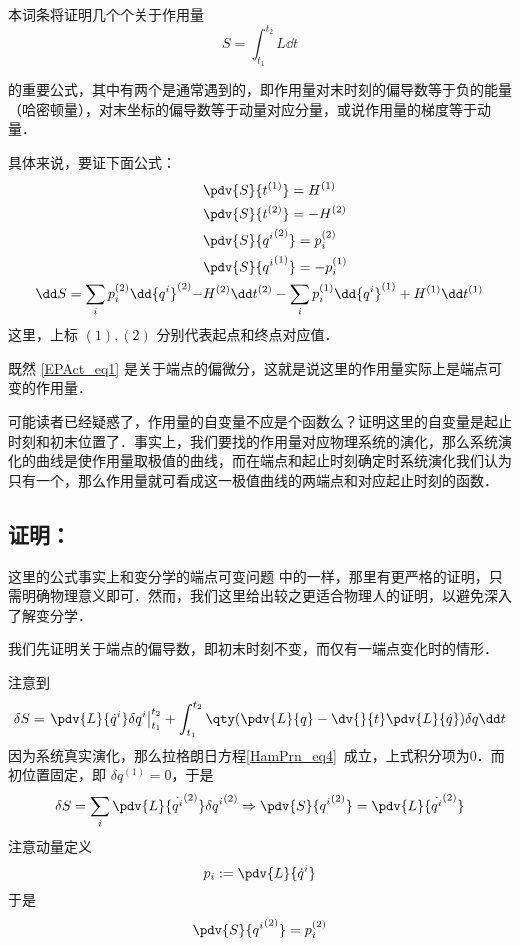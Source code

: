 本词条将证明几个个关于作用量
\begin{equation}
S=\int_{t_1}^{t_2}L\dd t
\end{equation}

的重要公式，其中有两个是通常遇到的，即作用量对末时刻的偏导数等于负的能量（哈密顿量），对末坐标的偏导数等于动量对应分量，或说作用量的梯度等于动量．

具体来说，要证下面公式：
\begin{equation}\label{EPAct_eq1}
\begin{aligned}
&\pdv{S}{t^{(1)}}=H^{(1)}\\
&\pdv{S}{t^{(2)}}=-H^{(2)}\\
&\pdv{S}{{q^i}^{(2)}}=p_i^{(2)}\\
&\pdv{S}{{q^i}^{(1)}}=-p_i^{(1)}\\
\dd S=\sum_i p_i^{(2)}\dd {q^i}^{(2)}-&H^{(2)}\dd t^{(2)}-\sum_i p_i^{(1)}\dd {q^i}^{(1)}+H^{(1)}\dd t^{(1)}
\end{aligned}
\end{equation}
这里，上标 $(1),(2)$ 分别代表起点和终点对应值．

既然 \autoref{EPAct_eq1} 是关于端点的偏微分，这就是说这里的作用量实际上是端点可变的作用量．

可能读者已经疑惑了，作用量的自变量不应是个函数么？证明这里的自变量是起止时刻和初末位置了．事实上，我们要找的作用量对应物理系统的演化，那么系统演化的曲线是使作用量取极值的曲线，而在端点和起止时刻确定时系统演化我们认为只有一个，那么作用量就可看成这一极值曲线的两端点和对应起止时刻的函数．
\subsection{证明：}
这里的公式事实上和变分学的端点可变问题 中的一样，那里有更严格的证明，只需明确物理意义即可．然而，我们这里给出较之更适合物理人的证明，以避免深入了解变分学．

我们先证明关于端点的偏导数，即初末时刻不变，而仅有一端点变化时的情形．

注意到
\begin{equation}
\delta S=\left.\pdv{L}{\dot q^i}\delta q^i\right|_{t_1}^{t_2}+\int_{t_1}^{t_2}\qty(\pdv{L}{q}-\dv{}{t}\pdv{L}{\dot q})\delta q\dd t
\end{equation}
因为系统真实演化，那么拉格朗日方程\autoref{HamPrn_eq4}~成立，上式积分项为0．而初位置固定，即 $\delta q^{(1)}=0$，于是
\begin{equation}
\delta S=\sum_i\pdv{L}{\dot {q^i}^{(2)}}\delta {q^i}^{(2)}\Rightarrow \pdv{S}{{q^i}^{(2)}}=\pdv{L}{\dot {q^i}^{(2)}}
\end{equation}
注意动量定义
\begin{equation}
p_i:=\pdv{L}{\dot q^i}
\end{equation}
于是
\begin{equation}
\pdv{S}{{q^i}^{(2)}}=p_i^{(2)}
\end{equation}

